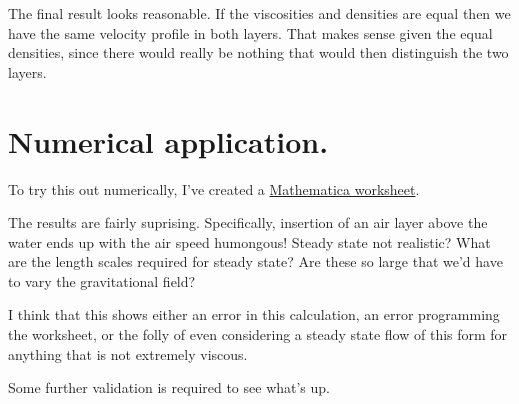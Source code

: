 The final result looks reasonable.  If the viscosities and densities are equal then we have the same velocity profile in both layers.  That makes sense given the equal densities, since there would really be nothing that would then distinguish the two layers.

\section{Numerical application.}

To try this out numerically, I've created a \href{https://raw.github.com/peeterjoot/physicsplay/master/notes/phy454/twoLayerInclinedFlowDifferentDensities.cdf}{Mathematica worksheet}.

The results are fairly suprising.  Specifically, insertion of an air layer above the water ends up with the air speed humongous!  Steady state not realistic?  What are the length scales required for steady state?  Are these so large that we'd have to vary the gravitational field?

I think that this shows either an error in this calculation, an error programming the worksheet, or the folly of even considering a steady state flow of this form for anything that is not extremely viscous.

Some further validation is required to see what's up.

\EndArticle
